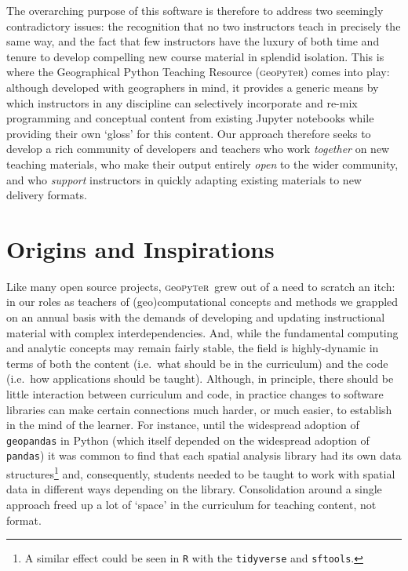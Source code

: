 \documentclass[letter, 11pt,titlepage]{article}
\newcommand{\gp}{\textsc{g}eo\textsc{p}y\textsc{t}e\textsc{r}~\/}
\newcommand{\ie}{i.e.~\/}
\begin{document}
The overarching purpose of this software is therefore to address two seemingly contradictory issues: the recognition that no two instructors teach in precisely the same way, and the fact that few instructors have the luxury of both time and tenure to develop compelling new course material in splendid isolation. This is  where the Geographical Python Teaching Resource (\textsc{g}eo\textsc{p}y\textsc{t}e\textsc{r}) comes into play: although developed with geographers in mind, it provides a generic means by which instructors in any discipline can selectively incorporate and re-mix programming and conceptual content from existing Jupyter notebooks while providing their own `gloss' for this content. Our approach therefore seeks to develop a rich community of developers and teachers who work \emph{together} on new teaching materials, who make their output entirely \emph{open} to the wider community, and who \emph{support} instructors in quickly adapting existing materials to new delivery formats. 

\section{Origins and Inspirations}\label{origins-and-inspirations}

Like many open source projects, \gp grew out of a need to scratch an itch: in our roles as teachers of (geo)computational concepts and methods we grappled on an annual basis with the demands of developing and updating instructional material with complex interdependencies. And, while the fundamental computing and analytic concepts may remain fairly stable, the field is highly-dynamic in terms of both the content (\ie what should be in the curriculum) and the code (\ie how applications should be taught). Although, in principle, there should be little interaction between curriculum and code, in practice changes to software libraries can make certain connections much harder, or much easier, to establish in the mind of the learner. For instance, until the widespread adoption of \texttt{geopandas} in Python (which itself depended on the widespread adoption of \texttt{pandas}) it was common to find that each spatial analysis library had its own data structures\footnote{A similar effect could be seen in \texttt{R} with the \texttt{tidyverse} and \texttt{sftools}.} and, consequently, students needed to be taught to work with spatial data in different ways depending on the library. Consolidation around a single approach freed up a lot of `space' in the curriculum for teaching content, not format.
\end{document}
